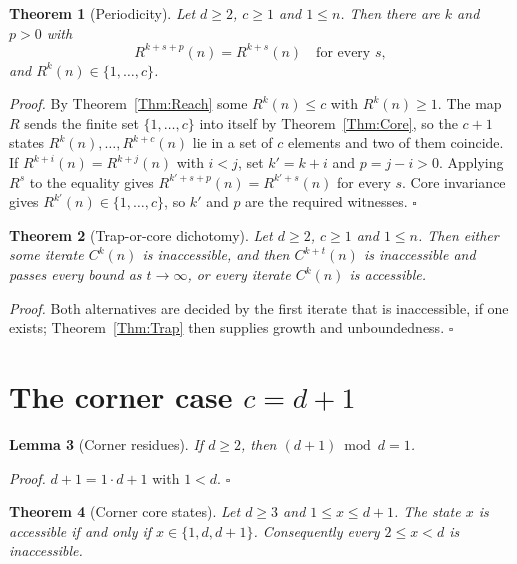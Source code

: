 \documentclass[11pt,letterpaper]{article}
\newtheorem{theorem}{Theorem}
\newtheorem{lemma}[theorem]{Lemma}
\newenvironment{proof}{\noindent\textit{Proof.}}{\hfill\(\square\)}
\begin{document}
\begin{theorem}[Periodicity]\label{Thm:Periodic}
Let \(d\ge2\), \(c\ge1\) and \(1\le n\). Then there are \(k\) and \(p>0\)
with
\[
 R^{k+s+p}(n)=R^{k+s}(n)\quad\text{for every }s,
\]
and \(R^{k}(n)\in\{1,\dots,c\}\).
\end{theorem}

\begin{proof}
By Theorem~\ref{Thm:Reach} some \(R^{k}(n)\le c\) with
\(R^{k}(n)\ge1\). The map \(R\) sends the finite set \(\{1,\dots,c\}\) into
itself by Theorem~\ref{Thm:Core}, so the \(c+1\) states
\(R^{k}(n),\dots,R^{k+c}(n)\) lie in a set of \(c\) elements and two of them
coincide. If \(R^{k+i}(n)=R^{k+j}(n)\) with \(i<j\), set
\(k'=k+i\) and \(p=j-i>0\). Applying \(R^s\) to the equality gives
\(R^{k'+s+p}(n)=R^{k'+s}(n)\) for every \(s\). Core invariance gives
\(R^{k'}(n)\in\{1,\ldots,c\}\), so \(k'\) and \(p\) are the required witnesses.
\end{proof}

\begin{theorem}[Trap-or-core dichotomy]\label{Thm:Dichotomy}
Let \(d\ge2\), \(c\ge1\) and \(1\le n\). Then either some iterate
\(C^{k}(n)\) is inaccessible, and then \(C^{k+t}(n)\) is inaccessible and
passes every bound as \(t\to\infty\), or every iterate \(C^{k}(n)\) is
accessible.
\end{theorem}

\begin{proof}
Both alternatives are decided by the first iterate that is inaccessible, if
one exists; Theorem~\ref{Thm:Trap} then supplies growth and unboundedness.
\end{proof}

\section{The corner case \(c=d+1\)}

\begin{lemma}[Corner residues]\label{Lem:CornerResidue}
If \(d\ge2\), then \((d+1)\bmod d=1\).
\end{lemma}

\begin{proof}
\(d+1=1\cdot d+1\) with \(1<d\).
\end{proof}

\begin{theorem}[Corner core states]\label{Thm:CornerCore}
Let \(d\ge3\) and \(1\le x\le d+1\). The state \(x\) is accessible if and
only if \(x\in\{1,d,d+1\}\). Consequently every \(2\le x<d\) is inaccessible.
\end{theorem}
\end{document}
